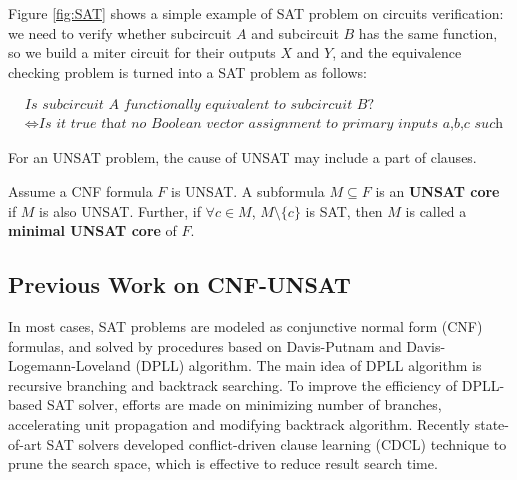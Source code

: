 Figure \ref{fig:SAT} shows a simple example of SAT problem on circuits verification:
we need to verify whether subcircuit $A$ and subcircuit $B$ has the same function, so
we build a miter circuit for their outputs $X$ and $Y$, and the equivalence checking 
problem is turned into a SAT problem as follows:

\begin{center}
\begin{align*}
&\textit{Is\ subcircuit\ A\ functionally\ equivalent\ to\ subcircuit\ B?}\\
&\Longleftrightarrow
\textit{Is\ it\ true\ that\ no\ Boolean\ vector\ assignment\ to\ primary\ inputs\ a,b,c\ such\ that\ Z=1?}
\end{align*}
\end{center}

\begin{figure}[H]
\end{figure}

For an UNSAT problem, the cause of UNSAT may include a part of clauses.
\begin{Definition}
Assume a CNF formula $F$ is UNSAT. A subformula $M \subseteq F$ is an {\bf UNSAT core} 
if $M$ is also UNSAT. Further, if $\forall c\in M$, $M\setminus\{c\}$ is SAT, then 
$M$ is called a {\bf minimal UNSAT core} of $F$.
\end{Definition}

\subsection{Previous Work on CNF-UNSAT}
In most cases, SAT problems are modeled as conjunctive normal form (CNF) formulas, and solved by procedures based on 
Davis-Putnam and Davis-Logemann-Loveland (DPLL) algorithm. The main idea of DPLL algorithm
is recursive branching and backtrack searching. To improve the efficiency of DPLL-based
SAT solver, efforts are made on minimizing number of branches, accelerating unit propagation
and modifying backtrack algorithm. Recently state-of-art SAT solvers developed conflict-driven
clause learning (CDCL) technique to prune the search space, which is effective to reduce
result search time.

